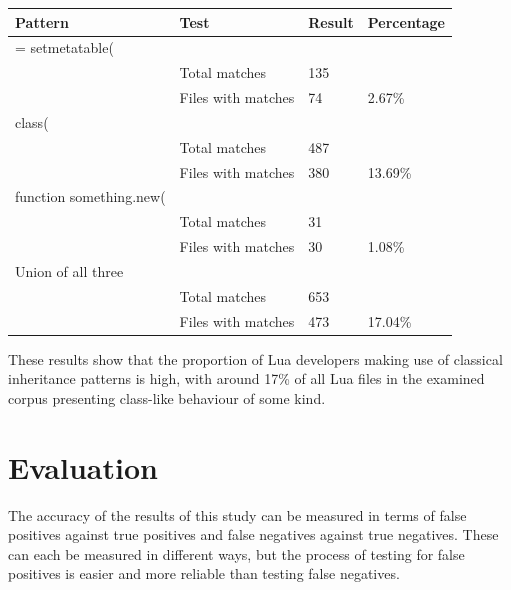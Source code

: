 \begin{center}
	\label{LuaResults}
	\begin{tabular}{|l|l|l|l|}
		\hline
		Pattern                 & Test               & Result & Percentage \\ \hline
		= setmetatable(        &                    &        &            \\ \hline
		& Total matches      & 135    &            \\ \hline
		& Files with matches & 74     & 2.67\%     \\ \hline
		class(                  &                    &        &            \\ \hline
		& Total matches      & 487    &            \\ \hline
		& Files with matches & 380    & 13.69\%    \\ \hline
		function something.new( &                    &        &            \\ \hline
		& Total matches      & 31     &            \\ \hline
		& Files with matches & 30     & 1.08\%     \\ \hline
		Union of all three      &                    &        &            \\ \hline
		& Total matches      & 653    &            \\ \hline
		& Files with matches & 473    & 17.04\%    \\ \hline
	\end{tabular}
	\newline
\end{center}

These results show that the proportion of Lua developers making use of classical inheritance patterns is high, with around 17\% of all Lua files in the examined corpus presenting class-like behaviour of some kind.


\section{Evaluation}
The accuracy of the results of this study can be measured in terms of false positives against true positives and false negatives against true negatives. These can each be measured in different ways, but the process of testing for false positives is easier and more reliable than testing false negatives.
\newline

